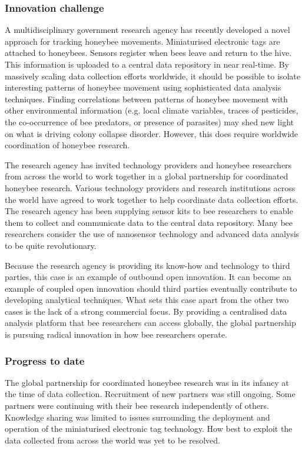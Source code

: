 \subsubsection{Innovation challenge}

A multidisciplinary government research agency has recently developed a novel approach for tracking honeybee movements. Miniaturised electronic tags are attached to honeybees. Sensors register when bees leave and return to the hive. This information is uploaded to a central data repository in near real-time. By massively scaling data collection efforts worldwide, it should be possible to isolate interesting patterns of honeybee movement using sophisticated data analysis techniques. Finding correlations between patterns of honeybee movement with other environmental information (e.g. local climate variables, traces of pesticides, the co-occurrence of bee predators, or presence of parasites) may shed new light on what is driving colony collapse disorder. However, this does require worldwide coordination of honeybee research. \medskip 

The research agency has invited technology providers and honeybee researchers from across the world to work together in a global partnership for coordinated honeybee research. Various technology providers and research institutions across the world have agreed to work together to help coordinate data collection efforts. The research agency has been supplying sensor kits to bee researchers to enable them to collect and communicate data to the central data repository. Many bee researchers consider the use of nanosensor technology and advanced data analysis to be quite revolutionary.
 \medskip

Because the research agency is providing its know-how and technology to third parties, this case is an example of outbound open innovation. It can become an example of coupled open innovation should third parties eventually contribute to developing analytical techniques. What sets this case apart from the other two cases is the lack of a strong commercial focus. By providing a centralised data analysis platform that bee researchers can access globally, the global partnership is pursuing radical innovation in how bee researchers operate.

\subsubsection{Progress to date}

The global partnership for coordinated honeybee research was in its infancy at the time of data collection. Recruitment of new partners was still ongoing. Some partners were continuing with their bee research independently of others. Knowledge sharing was limited to issues surrounding the deployment and operation of the miniaturised electronic tag technology. How best to exploit the data collected from across the world was yet to be resolved.  

